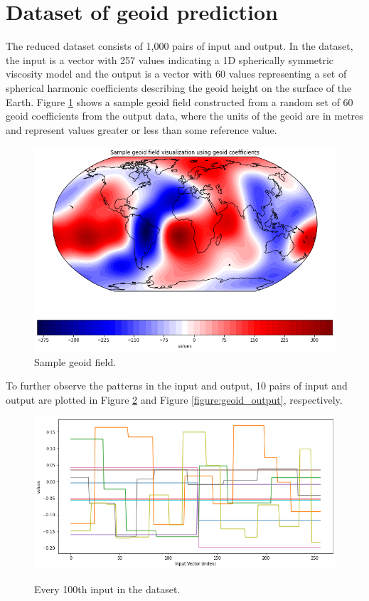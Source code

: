 \section{Dataset of geoid prediction}

The reduced dataset consists of 1,000 pairs of input and output. In the dataset, the input is a vector with 257 values indicating a 1D spherically symmetric viscosity model and the output is a vector with 60 values representing a set of spherical harmonic coefficients describing the geoid height on the surface of the Earth. Figure \ref{figure:geoid_sample} shows a sample geoid field constructed from a random set of 60 geoid coefficients from the output data, where the units of the geoid are in metres and represent values greater or less than some reference value.

\begin{figure}[H]
    \caption{Sample geoid field.}
    \label{figure:geoid_sample}
    \includegraphics[scale=0.6]{figures/geoid_images/Geoid_Sample_visualization.png}
\end{figure}

To further observe the patterns in the input and output, 10 pairs of input and output are plotted in Figure \ref{figure:geoid_input} and Figure \ref{figure:geoid_output}, respectively.

\begin{figure}[H]
    \centering
    \caption{Every 100th input in the dataset.}
    \includegraphics[scale=0.5]{figures/geoid_images/Geoid_sample_input.png}
    \label{figure:geoid_input}
\end{figure}

